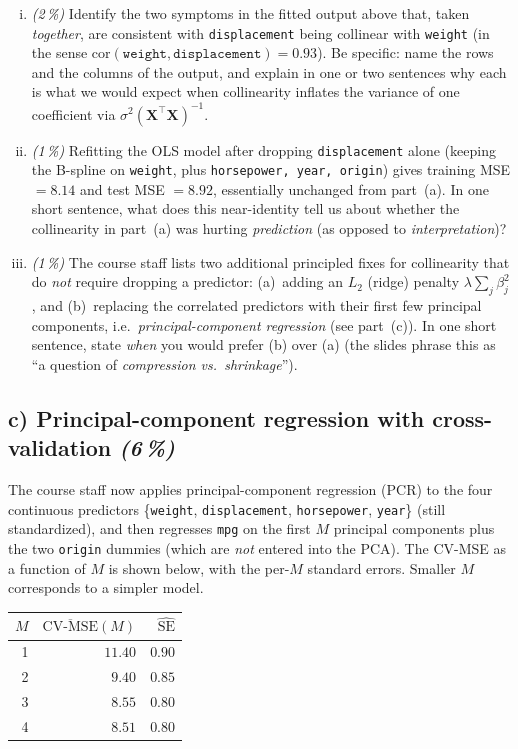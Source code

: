 \documentclass[11pt,a4paper]{article}
\newcommand{\subpoints}[1]{\textit{(#1\,\%)}}
\begin{document}
\begin{enumerate}[(i)]
  \item \subpoints{2} Identify the two symptoms in the fitted output above that, taken \emph{together}, are consistent with \texttt{displacement} being collinear with \texttt{weight} (in the sense $\mathrm{cor}(\texttt{weight}, \texttt{displacement}) = 0.93$). Be specific: name the rows and the columns of the output, and explain in one or two sentences why each is what we would expect when collinearity inflates the variance of one coefficient via $\sigma^2(\mathbf{X}^\top\mathbf{X})^{-1}$.

  \item \subpoints{1} Refitting the OLS model after dropping \texttt{displacement} alone (keeping the B-spline on \texttt{weight}, plus \texttt{horsepower, year, origin}) gives training MSE $= 8.14$ and test MSE $= 8.92$, essentially unchanged from part~(a). In one short sentence, what does this near-identity tell us about whether the collinearity in part~(a) was hurting \emph{prediction} (as opposed to \emph{interpretation})?

  \item \subpoints{1} The course staff lists two additional principled fixes for collinearity that do \emph{not} require dropping a predictor: (a)~adding an $L_2$ (ridge) penalty $\lambda \sum_j \beta_j^2$, and (b)~replacing the correlated predictors with their first few principal components, i.e.\ \emph{principal-component regression} (see part~(c)). In one short sentence, state \emph{when} you would prefer (b) over (a) (the slides phrase this as ``a question of \emph{compression vs.\ shrinkage}'').
\end{enumerate}

\subsection*{c) Principal-component regression with cross-validation \subpoints{6}}

The course staff now applies principal-component regression (PCR) to the four continuous predictors \{\texttt{weight}, \texttt{displacement}, \texttt{horsepower}, \texttt{year}\} (still standardized), and then regresses \texttt{mpg} on the first $M$ principal components plus the two \texttt{origin} dummies (which are \emph{not} entered into the PCA). The CV-MSE as a function of $M$ is shown below, with the per-$M$ standard errors. Smaller $M$ corresponds to a simpler model.

\begin{center}\small
\begin{tabular}{r r r}
\toprule
$M$ & $\overline{\mathrm{CV\text{-}MSE}}(M)$ & $\widehat{\mathrm{SE}}$ \\
\midrule
1 & $11.40$ & $0.90$ \\
2 & $9.40$  & $0.85$ \\
3 & $8.55$  & $0.80$ \\
4 & $8.51$  & $0.80$ \\
\bottomrule
\end{tabular}
\end{center}
\end{document}
